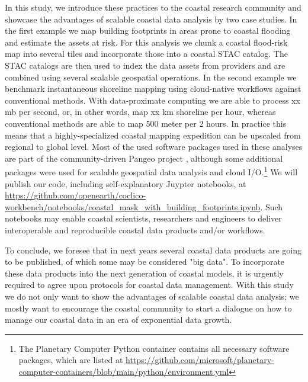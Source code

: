 \documentclass[11pt,twoside,a4paper]{article}
\begin{document}
{  In this study, we introduce these practices to the coastal research community and
  showcase the advantages of scalable coastal data analysis by two case studies.  In the
  first example we map building footprints in areas prone to coastal flooding and
  estimate the assets at risk. For this analysis we chunk a coastal flood-risk map into
  several tiles and incorporate those into a coastal STAC catalog. The STAC catalogs are
  then used to index the data assets from providers and are combined using several
  scalable geospatial operations. In the second example we benchmark instantaneous
  shoreline mapping using cloud-native workflows against conventional methods. With
  data-proximate computing we are able to process xx mb per second, or, in other words,
  map xx km shoreline per hour, whereas conventional methods
  \parencite{vosCoastSatGoogleEarth2019} are able to map 500 meter per 2 hours. In
  practice this means that a highly-specialized coastal mapping expedition can be
  upscaled from regional to global level. Most of the used software packages used in
  these analyses are part of the community-driven Pangeo project
  \parencite{hammanPangeoBigdataEcosystem2018}, although some additional packages were
  used for scalable geospatial data analysis and cloud I/O.\footnote{The Planetary
    Computer Python container contains all necessary software packages, which are listed
    at
    \url{https://github.com/microsoft/planetary-computer-containers/blob/main/python/environment.yml}}
  We will publish our code, including self-explanatory Juypter notebooks, at
  \url{https://github.com/openearth/coclico-workbench/notebooks/coastal_mask_with_building_footprints.ipynb}.
  Such notebooks may enable coastal scientists, researchers and engineers to deliver
  interoperable and reproducible coastal data products and/or workflows.

  To conclude, we foresee that in next years several coastal data products are going to
  be published, of which some may be considered "big data". To incorporate these data
  products into the next generation of coastal models, it is urgently required to agree
  upon protocols for coastal data management. With this study we do not only want to
  show the advantages of scalable coastal data analysis; we mostly want to encourage the
  coastal community to start a dialogue on how to manage our coastal data in an era of
  exponential data growth.}


\end{document}

